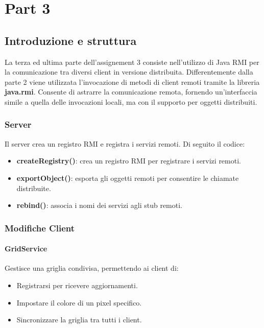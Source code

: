 \chapter{Part 3}
\label{ch:into} %

\section{Introduzione e struttura}

La terza ed ultima parte dell'assignement 3 consiste nell'utilizzo di Java RMI per la comunicazione tra diversi client in versione distribuita.
Differentemente dalla parte 2 viene utilizzata l'invocazione di metodi di client remoti tramite la libreria \textbf{java.rmi}. Consente di astrarre la comunicazione remota, fornendo un'interfaccia simile a quella delle invocazioni locali, ma con il supporto per oggetti distribuiti.


\subsection{Server}

Il server crea un registro RMI  e registra i servizi remoti. Di seguito il codice:

\begin{itemize}
    \item \textbf{createRegistry()}: crea un registro RMI per registrare i servizi remoti.
    \item \textbf{exportObject()}: esporta gli oggetti remoti per consentire le chiamate distribuite.
    \item \textbf{rebind()}: associa i nomi dei servizi agli stub remoti.
\end{itemize}


\subsection{Modifiche Client}

\subsubsection{GridService}
Gestisce una griglia condivisa, permettendo ai client di:

\begin{itemize}
    \item Registrarsi per ricevere aggiornamenti.
    \item Impostare il colore di un pixel specifico.
    \item Sincronizzare la griglia tra tutti i client.
\end{itemize}

